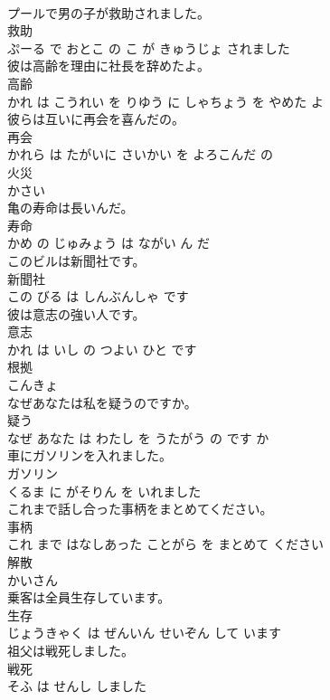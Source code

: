 \documentclass[8pt]{extreport}
\begin{document}
\begin{CJK}{UTF8}{min}
\\	プールで男の子が救助されました。	
\\	救助 
\\	ぷーる で おとこ の こ が きゅうじょ されました			
\\	彼は高齢を理由に社長を辞めたよ。	
\\	高齢 
\\	かれ は こうれい を りゆう に しゃちょう を やめた よ			
\\	彼らは互いに再会を喜んだの。	
\\	再会 
\\	かれら は たがいに さいかい を よろこんだ の			
\\	火災	
\\	かさい			
\\	亀の寿命は長いんだ。	
\\	寿命 
\\	かめ の じゅみょう は ながい ん だ			
\\	このビルは新聞社です。	
\\	新聞社 
\\	この びる は しんぶんしゃ です			
\\	彼は意志の強い人です。	
\\	意志 
\\	かれ は いし の つよい ひと です			
\\	根拠	
\\	こんきょ			
\\	なぜあなたは私を疑うのですか。	
\\	疑う 
\\	なぜ あなた は わたし を うたがう の です か			
\\	車にガソリンを入れました。	
\\	ガソリン 
\\	くるま に がそりん を いれました			
\\	これまで話し合った事柄をまとめてください。	
\\	事柄 
\\	これ まで はなしあった ことがら を まとめて ください			
\\	解散	
\\	かいさん			
\\	乗客は全員生存しています。	
\\	生存 
\\	じょうきゃく は ぜんいん せいぞん して います			
\\	祖父は戦死しました。	
\\	戦死 
\\	そふ は せんし しました			

\end{CJK}
\end{document}
